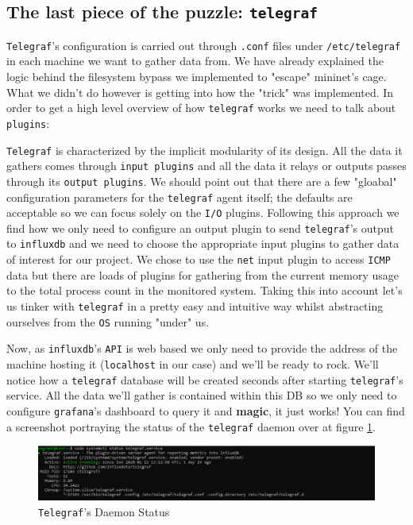 \documentclass[12pt]{article}
\newcommand{\newpar} {
    \vskip 1cm
}
\begin{document}
	\subsection{The last piece of the puzzle: \texttt{telegraf}}
		\texttt{Telegraf}'s configuration is carried out through \texttt{.conf} files under \texttt{/etc/telegraf} in each machine we want to gather data from. We have already explained the logic behind the filesystem bypass we implemented to "escape" mininet's cage. What we didn't do however is getting into how the "trick" was implemented. In order to get a high level overview of how \texttt{telegraf} works we need to talk about \texttt{plugins}:
		\newpar
		\texttt{Telegraf} is characterized by the implicit modularity of its design. All the data it gathers comes through \texttt{input plugins} and all the data it relays or outputs passes through its \texttt{output plugins}. We should point out that there are a few "gloabal" configuration parameters for the \texttt{telegraf} agent itself; the defaults are acceptable so we can focus solely on the \texttt{I/O} plugins. Following this approach we find how we only need to configure an output plugin to send \texttt{telegraf}'s output to \texttt{influxdb} and we need to choose the appropriate input plugins to gather data of interest for our project. We chose to use the \texttt{net} input plugin to access \texttt{ICMP} data but there are loads of plugins for gathering from  the current memory usage to the total process count in the monitored system. Taking this into account let's us tinker with \texttt{telegraf} in a pretty easy and intuitive way whilst abstracting ourselves from the \texttt{OS} running "under" us.
		\newpar
		Now, as \texttt{influxdb}'s \texttt{API} is web based we only need to provide the address of the machine hosting it (\texttt{localhost} in our case) and we'll be ready to rock. We'll notice how a \texttt{telegraf} database will be created seconds after starting \texttt{telegraf}'s service. All the data we'll gather is contained within this DB so we only need to configure \texttt{grafana}'s dashboard to query it and \textbf{magic}, it just works! You can find a screenshot portraying the status of the \texttt{telegraf} daemon over at figure \ref{f:telegrafd}.

		\begin{figure}
			\centering
			\includegraphics[width=\linewidth]{telegrafd.png}
			\caption{\texttt{Telegraf}'s Daemon Status}
			\label{f:telegrafd}
		\end{figure}
\end{document}
